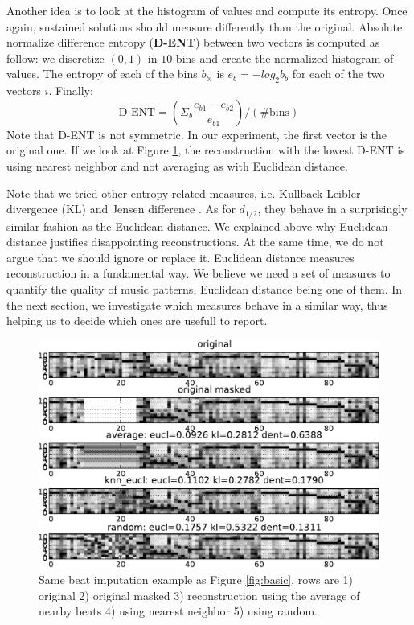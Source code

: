 \documentclass{article}
\begin{document}
Another idea is to look at the histogram of values and compute its
entropy. Once again, sustained solutions should measure differently
than the original.  Absolute normalize difference entropy
(\textbf{D-ENT}) \cite{Mentzelopoulos2004} between two vectors is
computed as follow: we discretize $(0,1)$ in $10$ bins and create the
normalized histogram of values.  The entropy of each of the bins
$b_{bi}$ is $e_b = - log_2 b_b$ for each of the two vectors
$i$. Finally:
\[
\mbox{D-ENT} = \left( \Sigma_b \frac{e_{b1} - e_{b2}}{e_{b1}} \right) / (\mbox{\# bins})
\]
Note that D-ENT is not symmetric. In our experiment, the first vector
is the original one.  If we look at Figure \ref{fig:avgnnrand}, the
reconstruction with the lowest D-ENT is using nearest neighbor and not
averaging as with Euclidean distance.

Note that we tried other entropy related measures,
i.e. Kullback-Leibler divergence (KL) and Jensen difference
\cite{Michel1994}. As for $d_{1/2}$, they behave in a surprisingly
similar fashion as the Euclidean distance.  We explained above why
Euclidean distance justifies disappointing reconstructions. At the
same time, we do not argue that we should ignore or replace
it. Euclidean distance measures reconstruction in a fundamental
way. We believe we need a set of measures to quantify the quality of
music patterns, Euclidean distance being one of them. In the next
section, we investigate which measures behave in a similar way, thus
helping us to decide which ones are usefull to report.

\begin{figure}[t]
\begin{center}
\includegraphics[width=.95\columnwidth]{avg_nn_rand}
\end{center}
\caption{Same beat imputation example as Figure \ref{fig:basic}, 
rows are 1) original 2) original masked
3) reconstruction using the average of nearby beats 4) using
nearest neighbor 5) using random.
\label{fig:avgnnrand}}
\end{figure}
\end{document}
